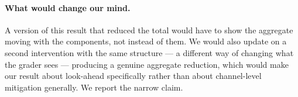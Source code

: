 \paragraph{What would change our mind.} A version of this result that reduced the total would have
to show the aggregate moving with the components, not instead of them. We would also update on a
second intervention with the same structure --- a different way of changing what the grader sees ---
producing a genuine aggregate reduction, which would make our result about look-ahead specifically
rather than about channel-level mitigation generally. We report the narrow claim.
